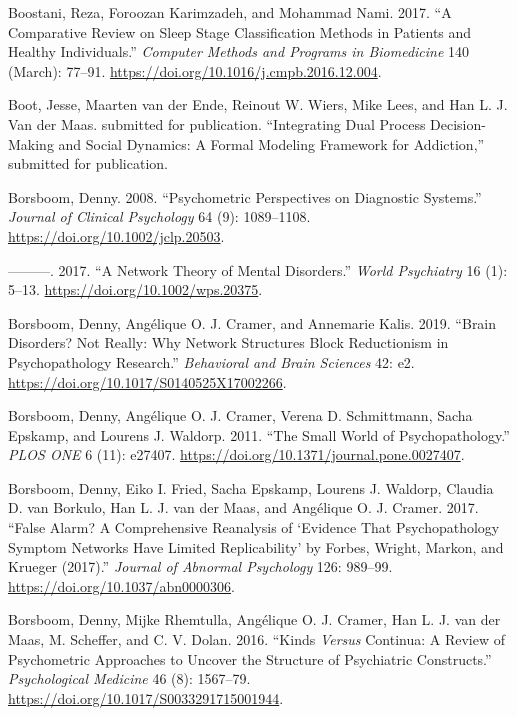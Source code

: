 \documentclass[
  a4paper,
  DIV=11,
  numbers=noendperiod,
  oneside]{scrreprt}
\newlength{\cslhangindent}
\newenvironment{CSLReferences}[2] %
 {\begin{list}{}{%
  \setlength{\itemindent}{0pt}
  \setlength{\leftmargin}{0pt}
  \setlength{\parsep}{0pt}
  \ifodd #1
   \setlength{\leftmargin}{\cslhangindent}
   \setlength{\itemindent}{-1\cslhangindent}
  \fi
  \setlength{\itemsep}{#2\baselineskip}}}
 {\end{list}}
\begin{document}
\begin{CSLReferences}{1}{0}
Boostani, Reza, Foroozan Karimzadeh, and Mohammad Nami. 2017. {``A
Comparative Review on Sleep Stage Classification Methods in Patients and
Healthy Individuals.''} \emph{Computer Methods and Programs in
Biomedicine} 140 (March): 77--91.
\url{https://doi.org/10.1016/j.cmpb.2016.12.004}.

Boot, Jesse, Maarten van der Ende, Reinout W. Wiers, Mike Lees, and Han
L. J. Van der Maas. submitted for publication. {``Integrating {Dual
Process Decision-Making} and {Social Dynamics}: {A Formal Modeling
Framework} for {Addiction},''} submitted for publication.

Borsboom, Denny. 2008. {``Psychometric Perspectives on Diagnostic
Systems.''} \emph{Journal of Clinical Psychology} 64 (9): 1089--1108.
\url{https://doi.org/10.1002/jclp.20503}.

---------. 2017. {``A Network Theory of Mental Disorders.''} \emph{World
Psychiatry} 16 (1): 5--13. \url{https://doi.org/10.1002/wps.20375}.

Borsboom, Denny, Angélique O. J. Cramer, and Annemarie Kalis. 2019.
{``Brain Disorders? Not Really: Why Network Structures Block
Reductionism in Psychopathology Research.''} \emph{Behavioral and Brain
Sciences} 42: e2. \url{https://doi.org/10.1017/S0140525X17002266}.

Borsboom, Denny, Angélique O. J. Cramer, Verena D. Schmittmann, Sacha
Epskamp, and Lourens J. Waldorp. 2011. {``The {Small World} of
{Psychopathology}.''} \emph{PLOS ONE} 6 (11): e27407.
\url{https://doi.org/10.1371/journal.pone.0027407}.

Borsboom, Denny, Eiko I. Fried, Sacha Epskamp, Lourens J. Waldorp,
Claudia D. van Borkulo, Han L. J. van der Maas, and Angélique O. J.
Cramer. 2017. {``False Alarm? {A} Comprehensive Reanalysis of
{`{Evidence} That Psychopathology Symptom Networks Have Limited
Replicability'} by {Forbes}, {Wright}, {Markon}, and {Krueger}
(2017).''} \emph{Journal of Abnormal Psychology} 126: 989--99.
\url{https://doi.org/10.1037/abn0000306}.

Borsboom, Denny, Mijke Rhemtulla, Angélique O. J. Cramer, Han L. J. van
der Maas, M. Scheffer, and C. V. Dolan. 2016. {``Kinds {\emph{Versus}}
Continua: A Review of Psychometric Approaches to Uncover the Structure
of Psychiatric Constructs.''} \emph{Psychological Medicine} 46 (8):
1567--79. \url{https://doi.org/10.1017/S0033291715001944}.


\end{CSLReferences}
\end{document}
